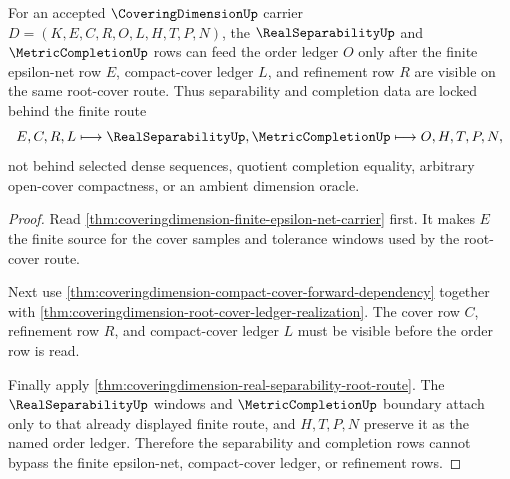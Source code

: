 \begin{theorem}
\label{thm:coveringdimension-root-cover-separability-completion-lock}
For an accepted $\CoveringDimensionUp$ carrier $D=(K,E,C,R,O,L,H,T,P,N)$, the $\RealSeparabilityUp$ and $\MetricCompletionUp$ rows can feed the order ledger $O$ only after the finite epsilon-net row $E$, compact-cover ledger $L$, and refinement row $R$ are visible on the same root-cover route. Thus separability and completion data are locked behind the finite route
$$
E,C,R,L \longmapsto \RealSeparabilityUp,\MetricCompletionUp \longmapsto O,H,T,P,N,
$$
not behind selected dense sequences, quotient completion equality, arbitrary open-cover compactness, or an ambient dimension oracle.
\end{theorem}
\begin{proof}
Read \autoref{thm:coveringdimension-finite-epsilon-net-carrier} first. It makes $E$ the finite source for the cover samples and tolerance windows used by the root-cover route.

Next use \autoref{thm:coveringdimension-compact-cover-forward-dependency} together with \autoref{thm:coveringdimension-root-cover-ledger-realization}. The cover row $C$, refinement row $R$, and compact-cover ledger $L$ must be visible before the order row is read.

Finally apply \autoref{thm:coveringdimension-real-separability-root-route}. The $\RealSeparabilityUp$ windows and $\MetricCompletionUp$ boundary attach only to that already displayed finite route, and $H,T,P,N$ preserve it as the named order ledger. Therefore the separability and completion rows cannot bypass the finite epsilon-net, compact-cover ledger, or refinement rows.
\end{proof}

